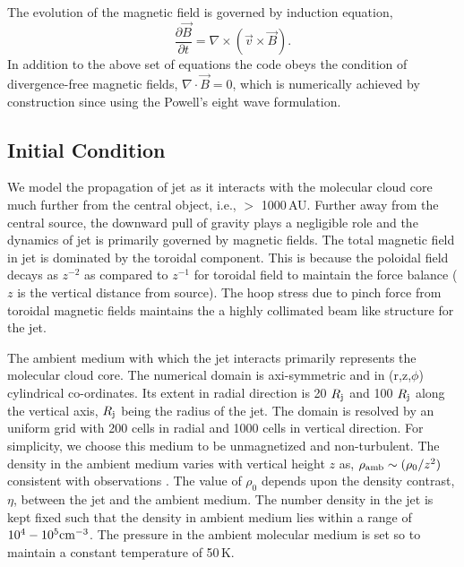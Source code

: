 \documentclass[useAMS,usenatbib,letters]{mn2e}
\begin{document}
The evolution of the magnetic field is governed by induction equation,
%
\begin{equation}\label{induction}
\frac{\partial \vec{B}}{\partial t} = \nabla \times \left(\vec{v}\times \vec{B}\right).
\end{equation}
%
In addition to the above set of equations the code obeys the condition of divergence-free 
magnetic fields, $\nabla \cdot \vec{B} = 0$, which is numerically achieved by construction 
since using the Powell's eight wave formulation.
\subsection{Initial Condition}
We model the propagation of jet as it interacts with the molecular
cloud core much further from the central object, i.e., $>$ 1000\,AU. 
Further away from the central source, the downward pull of gravity plays a
negligible role and the dynamics of jet is primarily governed by magnetic fields.
The total magnetic field in jet is dominated by the toroidal
component. This is because the poloidal field decays as $z^{-2}$ as
compared to $z^{-1}$ for toroidal field to maintain the force balance ($z$ is the vertical distance from source). 
The hoop stress due to pinch force from toroidal magnetic fields maintains the
a highly collimated beam like structure for the jet.
%

The ambient medium with which the jet interacts primarily
represents the molecular cloud core. The numerical domain is axi-symmetric
and in (r,z,$\phi$) cylindrical co-ordinates. Its extent in radial
direction is 20 $R_{\rm j}$ and 100
$R_{\rm j}$ along the vertical axis, $R_{\rm j}$ being the radius of
the jet. The domain is resolved by an uniform grid with 200 cells in
radial and 1000 cells in vertical direction. For simplicity, we choose this medium
to be unmagnetized and non-turbulent. The density in the ambient
medium varies with vertical height $z$ as, $\rho_{\rm amb}\sim (\rho_0/z^{2})$
consistent with observations \citep{Caselli:2011p13935}. The value of
$\rho_0$ depends upon the density contrast, $\eta$, between the jet and
the ambient medium. The number density in the jet is kept fixed such
that the density in ambient medium lies within a range of $10^{4}-10^{5}
\rm cm^{-3}$. The pressure in the ambient molecular medium is
set so to maintain a constant temperature of 50\,K. 
%
\end{document}
